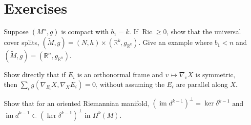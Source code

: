 \section{Exercises}

\begin{remark}[Exercise 9.6.1]
  \label{rem:pet-ch9-exercise-9-6-1}
  Suppose $(M^n,g)$ is compact with $b_1=k$. If $\operatorname{Ric}\ge0$, show that the
  universal cover splits, $(\tilde M,g)=(N,h)\times(\mathbb{R}^k,g_{\mathbb{R}^k})$. Give an
  example where $b_1<n$ and $(\tilde M,g)=(\mathbb{R}^n,g_{\mathbb{R}^n})$.
\end{remark}

\begin{remark}[Exercise 9.6.2]
  \label{rem:pet-ch9-exercise-9-6-2}
  Show directly that if $E_i$ is an orthonormal frame and $v\mapsto\nabla_vX$
  is symmetric, then $\sum_ig(\nabla_{E_i}X,\nabla_XE_i)=0$, without assuming
  the $E_i$ are parallel along $X$.
\end{remark}

\begin{remark}[Exercise 9.6.3]
  \label{rem:pet-ch9-exercise-9-6-3}
  Show that for an oriented Riemannian manifold,
  $(\operatorname{im}d^{k-1})^\perp=\ker\delta^{k-1}$ and $\operatorname{im}d^{k-1}\subset
  (\ker\delta^{k-1})^\perp$ in $\Omega^k(M)$.
\end{remark}

